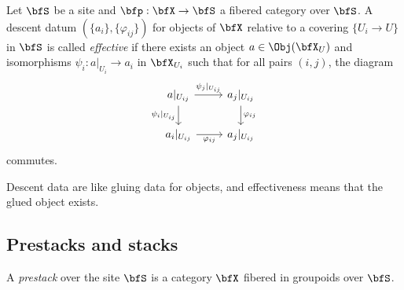     \begin{example}%
    \end{example}

    \begin{definition}%
        Let \(\bfS\) be a site and \(\bfp: \bfX \to \bfS\) a fibered category over \(\bfS\).
        A descent datum \((\{ a_i \}, \{ \varphi_{ij} \})\) for objects of \(\bfX\) relative to a covering \(\{ U_i \to U \}\) in \(\bfS\) is called \emph{effective} if there exists an object \(a \in \Obj(\bfX_U)\) and isomorphisms \(\psi_i: a|_{U_i} \to a_i\) in \(\bfX_{U_i}\) such that for all pairs \((i,j)\), the diagram
        \[ \begin{tikzcd}
            a|_{U_{ij}} \arrow[r, "\psi_j|_{U_{ij}}"] \arrow[d, "\psi_i|_{U_{ij}}"'] & a_j|_{U_{ij}} \arrow[d, "\varphi_{ij}"] \\
            a_i|_{U_{ij}} \arrow[r, "\varphi_{ij}"'] & a_j|_{U_{ij}}
        \end{tikzcd} \]
        commutes.
    \end{definition}

    \begin{slogan}%
        Descent data are like gluing data for objects, and effectiveness means that the glued object exists.
    \end{slogan}


\subsection{Prestacks and stacks}



    \begin{definition}%
        A \emph{prestack} over the site \(\bfS\) is a category \(\bfX\) fibered in groupoids over \(\bfS\).
    \end{definition}


